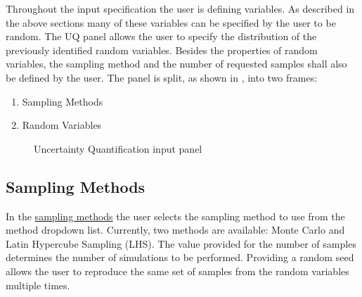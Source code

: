 Throughout the input specification the user is defining variables. As
described in the above sections many of these variables can be
specified by the user to be random. The UQ panel allows the user to specify the distribution of the previously identified random variables. Besides the properties of random variables, the sampling method and the number of requested samples shall also be defined by the user. The panel is split, as shown
in , into two frames:

\begin{enumerate}
\item Sampling Methods 
\item Random Variables
\end{enumerate}

\begin{figure}[!htbp]
  \caption{Uncertainty Quantification input panel}
  \label{fig:uq_panel}
\end{figure}

\subsection{Sampling Methods}
In the \href{https://dakota.sandia.gov//sites/default/files/docs/6.9/html-ref/methods-sampling.html}{sampling methods} the user selects the sampling 
method to use from the method dropdown list. Currently, two methods are available: 
Monte Carlo and Latin Hypercube Sampling (LHS). The value provided for the number of samples determines the number of simulations to be performed. Providing a random seed allows the user to reproduce the same set of samples from the random variables multiple times.

